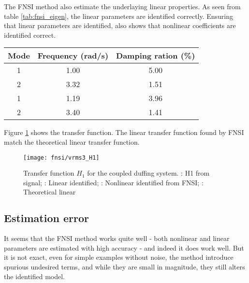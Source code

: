 The FNSI method also estimate the underlaying linear properties. As seen from
table \ref{tab:fnsi_eigen}, the linear parameters are identified correctly.
Ensuring that linear parameters are identified, also shows that nonlinear
coefficients are identified correct.

\begin{center}
  \begin{tabular}{*{3}{c}}
    \hline
    Mode & Frequency (rad/s) & Damping ration (\%) \\
    \hline
    1 & 1.00 & 5.00 \\
    2 & 3.32 & 1.51 \\
    \hline
    1 & 1.19 & 3.96 \\
    2 & 3.40 & 1.41 \\
    \hline
  \end{tabular}
  \label{tab:fnsi_eigen}
\end{center}

Figure \ref{fig:fnsi_H1} shows the transfer function. The linear transfer
function found by FNSI match the theoretical linear transfer function.

\begin{figure}[!ht]
  \centering
  \texttt{[image: fnsi/vrms3\_H1]}
  \caption{Transfer function $H_1$ for the coupled duffing system.
    \sampleline{}: H1 from signal;
    \textcolor{red}{}: Linear identified;
    \textcolor{orange}{}: Nonlinear identified from FNSI;
    \textcolor{blue}{}: Theoretical linear
  }
  \label{fig:fnsi_H1}
\end{figure}

\subsection{Estimation error}
\label{sec:fnsi-estimation-error}

It seems that the FNSI method works quite well - both nonlinear and linear
parameters are estimated with high accuracy - and indeed it does work well. But
it is not exact, even for simple examples without noise, the method introduce
spurious undesired terms, and while they are small in magnitude, they still
alters the identified model.

